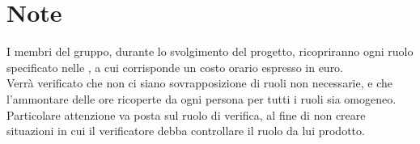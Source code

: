 \documentclass[PianoDiProgetto.tex]{subfiles}
\begin{document}
\section{Note}
I membri del gruppo, durante lo svolgimento del progetto, ricopriranno ogni ruolo specificato nelle \ndp, a cui corrisponde un costo orario espresso in euro.\\
Verrà verificato che non ci siano sovrapposizione di ruoli non necessarie, e che l'ammontare delle ore ricoperte da ogni persona per tutti i ruoli sia omogeneo.\\
Particolare attenzione va posta sul ruolo di verifica, al fine di non creare situazioni in cui il verificatore debba controllare il ruolo da lui prodotto.
\end{document}
